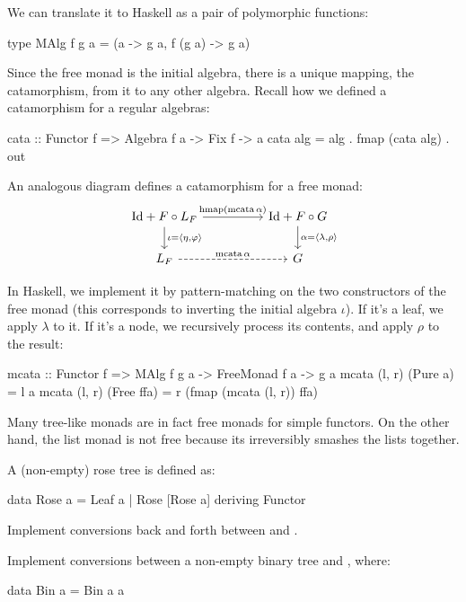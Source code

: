 \documentclass[DaoFP]{subfiles}
\begin{document}
We can translate it to Haskell as a pair of polymorphic functions:
\begin{haskell}
type MAlg f g a = (a -> g a, f (g a) -> g a)
\end{haskell}

Since the free monad is the initial algebra, there is a unique mapping, the catamorphism, from it to any other algebra. Recall how we defined a catamorphism for a regular algebras:
\begin{haskell}
cata :: Functor f => Algebra f a -> Fix f -> a
cata alg = alg . fmap (cata alg) . out
\end{haskell}

An analogous diagram defines a catamorphism for a free monad:
\[
 \begin{tikzcd}
 \text{Id} + F \circ L_F
 \arrow[rr, "{\text{hmap} (\text{mcata}\, \alpha)}"]
 \arrow[d, "{\iota = \langle \eta, \varphi \rangle}"]
 && \text{Id} + F \circ G
\arrow[d, "{\alpha = \langle \lambda, \rho \rangle}"]
 \\
 L_F
 \arrow[rr, dashed, "\text{mcata}\, \alpha"]
 && G
  \end{tikzcd}
\]

In Haskell, we implement it by pattern-matching on the two constructors of the free monad (this corresponds to inverting the initial algebra $\iota$). If it's a leaf, we apply $\lambda$ to it. If it's a node, we recursively process its contents, and apply $\rho$ to the result:
\begin{haskell}
mcata :: Functor f => MAlg f g a -> FreeMonad f a -> g a
mcata (l, r) (Pure a) = l a
mcata (l, r) (Free ffa) = 
  r (fmap (mcata (l, r)) ffa)
\end{haskell}

Many tree-like monads are in fact free monads for simple functors. On the other hand, the list monad is not free because its  irreversibly smashes the lists together.

\begin{exercise}
A (non-empty) rose tree is defined as:
\begin{haskell}
data Rose a = Leaf a | Rose [Rose a]
  deriving Functor
\end{haskell}
Implement conversions back and forth between  and  .
\end{exercise}

\begin{exercise}
Implement conversions between a non-empty binary tree and , where:
\begin{haskell}
data Bin a = Bin a a
\end{haskell}
\end{exercise}
\end{document}
